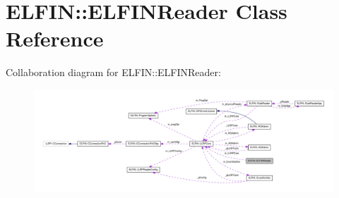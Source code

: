 \hypertarget{class_e_l_f_i_n_1_1_e_l_f_i_n_reader}{\section{E\-L\-F\-I\-N\-:\-:E\-L\-F\-I\-N\-Reader Class Reference}
\label{class_e_l_f_i_n_1_1_e_l_f_i_n_reader}
}


Collaboration diagram for E\-L\-F\-I\-N\-:\-:E\-L\-F\-I\-N\-Reader\-:
\nopagebreak
\begin{figure}[H]
\begin{center}
\leavevmode
\includegraphics[width=350pt]{class_e_l_f_i_n_1_1_e_l_f_i_n_reader__coll__graph}
\end{center}
\end{figure}
